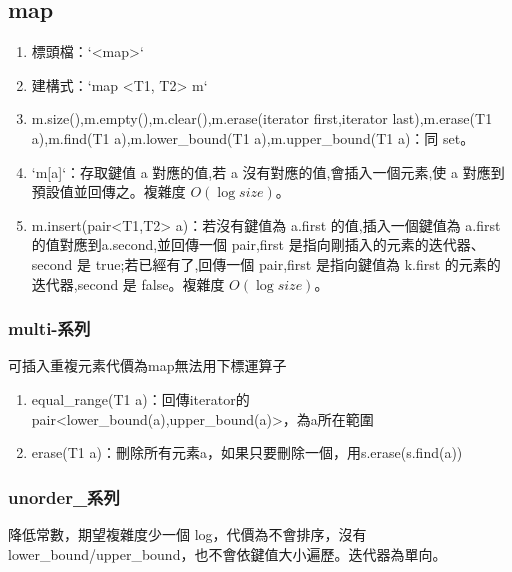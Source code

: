 \subsection{map}
\begin{enumerate}
\item 標頭檔：`<map>`
\item 建構式：`map <T1, T2> m`
\item m.size(),m.empty(),m.clear(),m.erase(iterator first,iterator last),m.erase(T1 a),m.find(T1 a),m.lower\_bound(T1 a),m.upper\_bound(T1 a)：同 set。
\item `m[a]`：存取鍵值 a 對應的值,若 a 沒有對應的值,會插入一個元素,使 a 對應到預設值並回傳之。複雜度 $O(\log size)$。
\item m.insert(pair<T1,T2> a)：若沒有鍵值為 a.first 的值,插入一個鍵值為 a.first 的值對應到a.second,並回傳一個 pair,first 是指向剛插入的元素的迭代器、second 是 true;若已經有了,回傳一個 pair,first 是指向鍵值為 k.first 的元素的迭代器,second 是 false。複雜度 $O(\log size)$。

\end{enumerate}
\subsubsection{multi-系列}
可插入重複元素代價為map無法用下標運算子
\begin{enumerate}
\item equal\_range(T1 a)：回傳iterator的pair<lower\_bound(a),upper\_bound(a)>，為a所在範圍
\item erase(T1 a)：刪除所有元素a，如果只要刪除一個，用s.erase(s.find(a))
\end{enumerate}
\subsubsection{unorder\_系列}
降低常數，期望複雜度少一個 log，代價為不會排序，沒有lower\_bound/upper\_bound，也不會依鍵值大小遍歷。迭代器為單向。








